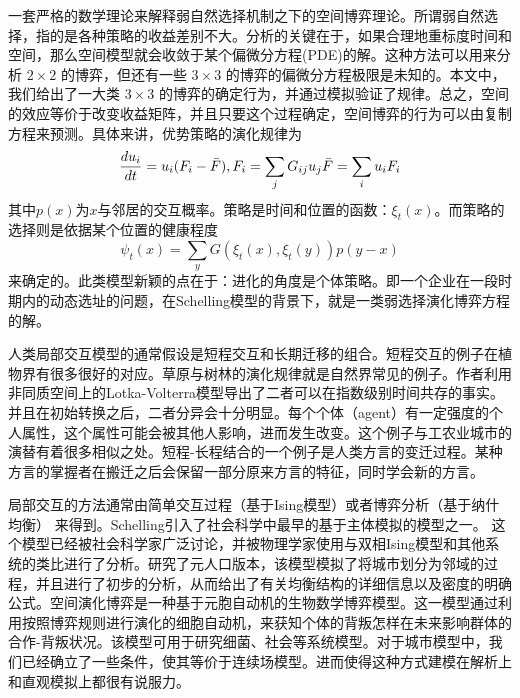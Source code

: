 一套严格的数学理论来解释弱自然选择机制之下的空间博弈理论。所谓弱自然选择，指的是各种策略的收益差别不大。分析的关键在于，如果合理地重标度时间和空间，那么空间模型就会收敛于某个偏微分方程(PDE)的解\cite{nanda2017spatial}。这种方法可以用来分析 $2 \times 2$ 的博弈，但还有一些 $3 \times 3$ 的博弈的偏微分方程极限是未知的。本文中，我们给出了一大类 $3 \times 3$ 的博弈的确定行为，并通过模拟验证了规律。总之，空间的效应等价于改变收益矩阵，并且只要这个过程确定，空间博弈的行为可以由复制方程来预测。具体来讲，优势策略的演化规律为\[\frac{du_i}{dt} = u_i (F_i-\bar{F}),\notag\\
F_i = \sum_j G_{ij}u_{j}\notag\\
\bar{F} = \sum_i u_i F_i\]其中\(p(x)\)为$x$与邻居的交互概率。策略是时间和位置的函数：\(\xi_t(x)\)。而策略的选择则是依据某个位置的健康程度\[\psi_t(x) = \sum_y G(\xi_t(x),\xi_t(y))p(y-x)\]来确定的。此类模型新颖的点在于：进化的角度是个体策略。即一个企业在一段时期内的动态选址的问题，在Schelling模型的背景下，就是一类弱选择演化博弈方程的解。


人类局部交互模型的通常假设是短程交互和长期迁移的组合\cite{rybski2009scaling}。短程交互的例子在植物界有很多很好的对应。草原与树林的演化规律就是自然界常见的例子\cite{durrett2018heterogeneous,durrett2009coexistence}。作者利用非同质空间上的Lotka-Volterra模型导出了二者可以在指数级别时间共存的事实。并且在初始转换之后，二者分异会十分明显。每个个体（agent）有一定强度的个人属性，这个属性可能会被其他人影响，进而发生改变。这个例子与工农业城市的演替有着很多相似之处。短程-长程结合的一个例子是人类方言的变迁过程\cite{PhysRevX.7.031008,seoane2018coexistence,PhysRevE.99.032305}。某种方言的掌握者在搬迁之后会保留一部分原来方言的特征，同时学会新的方言。

局部交互的方法通常由简单交互过程（基于Ising模型）或者博弈分析（基于纳什均衡）\cite{grimalda2016social,Mussa2019Urbanity} 来得到。Schelling引入了社会科学中最早的基于主体模拟的模型之一。 这个模型已经被社会科学家广泛讨论，并被物理学家使用与双相Ising模型和其他系统的类比进行了分析。\cite{Durrett14036}研究了元人口版本，该模型模拟了将城市划分为邻域的过程，并且进行了初步的分析，从而给出了有关均衡结构的详细信息以及密度的明确公式。空间演化博弈\cite{nowak1992evolutionary}是一种基于元胞自动机的生物数学博弈模型。这一模型通过利用按照博弈规则进行演化的细胞自动机，来获知个体的背叛怎样在未来影响群体的合作-背叛状况。该模型可用于研究细菌、社会等系统模型。对于城市模型中，我们已经确立了一些条件\cite{DURRETT1994363}，使其等价于连续场模型。进而使得这种方式建模在解析上和直观模拟上都很有说服力。




